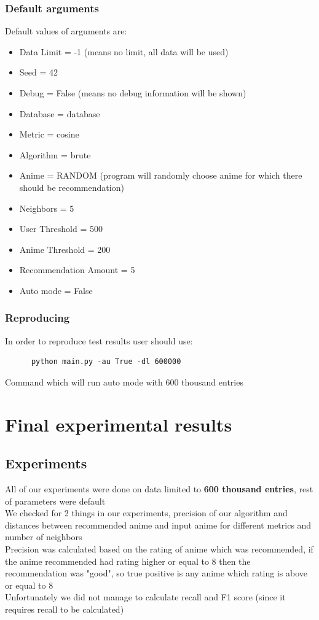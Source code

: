 \documentclass[12pt]{article}
\begin{document}
    \subsubsection{Default arguments}
    Default values of arguments are:
    \begin{itemize}
      \item Data Limit = -1 (means no limit, all data will be used)
      \item Seed = 42
      \item Debug = False (means no debug information will be shown)
      \item Database = database 
      \item Metric = cosine
      \item Algorithm = brute
      \item Anime = RANDOM (program will randomly choose anime for which there should be recommendation)
      \item Neighbors = 5
      \item User Threshold = 500
      \item Anime Threshold = 200 
      \item Recommendation Amount = 5
      \item Auto mode = False
    \end{itemize}
    \subsubsection{Reproducing}
    In order to reproduce test results user should use:
    \begin{lstlisting}
      python main.py -au True -dl 600000
    \end{lstlisting}
    Command which will run auto mode with 600 thousand entries
      

\section{Final experimental results}
\subsection{Experiments}
All of our experiments were done on data limited to \textbf{600 thousand entries}, rest of parameters were default \\ 
We checked for 2 things in our experiments, precision of our algorithm and distances between recommended anime and input anime for different metrics and number of neighbors \\ 
Precision was calculated based on the rating of anime which was recommended, if the anime recommended had rating higher or equal to 8 then the recommendation was "good", so true positive is any anime which rating is above or equal to 8 \\ 
Unfortunately we did not manage to calculate recall and F1 score (since it requires recall to be calculated)
\end{document}
